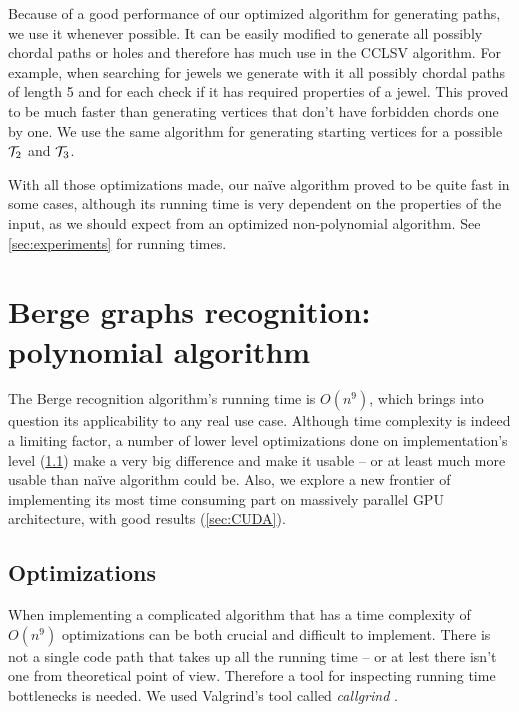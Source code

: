 Because of a good performance of our optimized algorithm for generating paths, we use it whenever possible. It can be easily modified to generate all possibly chordal paths or holes and therefore has much use in the CCLSV algorithm. For example, when searching for jewels we generate with it all possibly chordal paths of length 5 and for each check if it has required properties of a jewel. This proved to be much faster than generating vertices that don't have forbidden chords one by one. We use the same algorithm for generating starting vertices for a possible $\mathcal{T}_2$ and $\mathcal{T}_3$.

With all those optimizations made, our na\"ive algorithm proved to be quite fast in some cases, although its running time is very dependent on the properties of the input, as we should expect from an optimized non-polynomial algorithm. See \cref{sec:experiments} for running times.

\section{Berge graphs recognition: polynomial algorithm}


The Berge recognition algorithm's running time is $O(n^9)$, which brings into question its applicability to any real use case. Although time complexity is indeed a limiting factor, a number of lower level optimizations done on implementation's level (\cref{sec:Optimizations}) make a very big difference and make it usable -- or at least much more usable than na\"ive algorithm could be. Also, we explore a new frontier of implementing its most time consuming part on massively parallel GPU architecture, with good results (\cref{sec:CUDA}).


\subsection{Optimizations}
\label{sec:Optimizations}

When implementing a complicated algorithm that has a time complexity of $O(n^9)$ optimizations can be both crucial and difficult to implement. There is not a single code path that takes up all the running time -- or at lest there isn't one from theoretical point of view. Therefore a tool for inspecting running time bottlenecks is needed. We used Valgrind's tool called \emph{callgrind} \cite{callgrind}.

